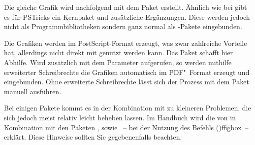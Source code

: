 \documentclass[%
  english,ngerman,%
  cdgeometry=no,DIV=12,%
  cd=false,cdfont=false,cdtitle=true,%
  headings=normal,%
  automark,%
  listof=toc,%
]{tudscrartcl}
\begin{document}
Die gleiche Grafik wird nachfolgend mit dem Paket  erstellt. 
Ähnlich wie bei  gibt es für PSTricks ein Kernpaket und 
zusätzliche Ergänzungen. Diese werden jedoch nicht als Programmbibliotheken 
sondern ganz normal als -Pakete eingebunden.
%
\begin{Hint}
\usepackage{pstricks,pst-node}
\end{Hint}
%
Die Grafiken werden im PostScript-Format erzeugt, was zwar zahlreiche Vorteile 
hat, allerdings nicht direkt mit  genutzt werden kann. Das 
Paket  schafft hier Abhilfe. Wird  
zusätzlich mit dem Parameter  aufgerufen, so werden 
mithilfe erweiterter Schreibrechte die Grafiken automatisch im PDF"~Format 
erzeugt und eingebunden. Ohne erweiterte Schreibrechte lässt sich der Prozess 
mit dem Paket  manuell ausführen.
%
\begin{Hint}
\usepackage{auto-pst-pdf}
\end{Hint}
%
Bei einigen Pakete kommt es in der Kombination mit  zu 
kleineren Problemen, die sich jedoch meist relativ leicht beheben lassen. Im 
Handbuch wird die  
von  in Kombination mit den Paketen , 
 sowie ~-- bei der Nutzung des Befehls 
\Macro(){ffigbox}~-- erklärt. Diese Hinweise sollten Sie 
gegebenenfalls beachten.
\end{document}
